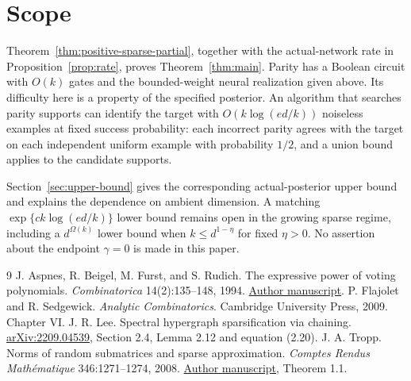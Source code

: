 \documentclass[11pt]{article}
\theoremstyle{remark}\newtheorem{remark}[theorem]{Remark}
\begin{document}













\section{Scope}
Theorem~\ref{thm:positive-sparse-partial}, together with the actual-network
rate in Proposition~\ref{prop:rate}, proves Theorem~\ref{thm:main}.
Parity has a Boolean circuit with $O(k)$ gates and the bounded-weight
neural realization given above. Its difficulty here is a property of the
specified posterior. An algorithm that searches parity supports can
identify the target with $O(k\log(ed/k))$ noiseless examples at fixed
success probability: each incorrect parity agrees with the target on
each independent uniform example with probability $1/2$, and a union
bound applies to the candidate supports.

Section~\ref{sec:upper-bound} gives the corresponding actual-posterior
upper bound and explains the dependence on ambient dimension. A matching
$\exp\{c k\log(ed/k)\}$ lower bound remains open in the growing sparse
regime, including a $d^{\Omega(k)}$ lower bound when $k\le d^{1-\eta}$
for fixed $\eta>0$. No assertion about the endpoint $\gamma=0$ is made
in this paper.

\begin{thebibliography}{9}
J. Aspnes, R. Beigel, M. Furst, and S. Rudich.
The expressive power of voting polynomials.
\emph{Combinatorica} 14(2):135--148, 1994.
\href{https://www.cs.yale.edu/homes/aspnes/papers/stoc91voting.pdf}{Author manuscript}.
P. Flajolet and R. Sedgewick. \emph{Analytic Combinatorics}.
Cambridge University Press, 2009. Chapter VI.
J. R. Lee. Spectral hypergraph sparsification via chaining.
\href{https://arxiv.org/abs/2209.04539}{arXiv:2209.04539},
Section 2.4, Lemma 2.12 and equation (2.20).
J. A. Tropp. Norms of random submatrices and sparse approximation.
\emph{Comptes Rendus Math\'ematique} 346:1271--1274, 2008.
\href{https://tropp.caltech.edu/papers/Tro08-Norms-Random-v3.pdf}{Author manuscript},
Theorem 1.1.
\end{thebibliography}
\end{document}
